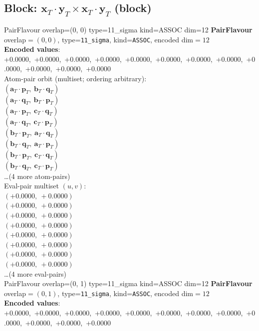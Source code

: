 \documentclass[a4paper,11pt]{article}
\newcommand{\fpbeomcfokjooi}[2]{\mathbf{#1}_T \cdot \mathbf{#2}_T}
\begin{document}
\subsection{Block: $\fpbeomcfokjooi{x}{y} \times \fpbeomcfokjooi{x}{y}$  (block)}
    PairFlavour  overlap=(0, 0)  type=11\_sigma  kind=ASSOC  dim=12
\textbf{PairFlavour} overlap$=(0, 0)$, type=\texttt{11\_sigma}, kind=\texttt{ASSOC}, encoded dim$=12$\\
\textbf{      Encoded values}: +0.0000,\ +0.0000,\ +0.0000,\ +0.0000,\ +0.0000,\ +0.0000,\ +0.0000,\ +0.0000,\ +0.0000,\ +0.0000,\ +0.0000,\ +0.0000\\
\quad Atom-pair orbit (multiset; ordering arbitrary):\\
$(\fpbeomcfokjooi{a}{p},\ \fpbeomcfokjooi{b}{q})$\\
$(\fpbeomcfokjooi{a}{q},\ \fpbeomcfokjooi{b}{p})$\\
$(\fpbeomcfokjooi{a}{p},\ \fpbeomcfokjooi{c}{q})$\\
$(\fpbeomcfokjooi{a}{q},\ \fpbeomcfokjooi{c}{p})$\\
$(\fpbeomcfokjooi{b}{p},\ \fpbeomcfokjooi{a}{q})$\\
$(\fpbeomcfokjooi{b}{q},\ \fpbeomcfokjooi{a}{p})$\\
$(\fpbeomcfokjooi{b}{p},\ \fpbeomcfokjooi{c}{q})$\\
$(\fpbeomcfokjooi{b}{q},\ \fpbeomcfokjooi{c}{p})$\\
\quad \ldots (4 more atom-pairs)\\
\quad Eval-pair multiset $(u, v)$:\\
$(+0.0000,\ +0.0000)$\\
$(+0.0000,\ +0.0000)$\\
$(+0.0000,\ +0.0000)$\\
$(+0.0000,\ +0.0000)$\\
$(+0.0000,\ +0.0000)$\\
$(+0.0000,\ +0.0000)$\\
$(+0.0000,\ +0.0000)$\\
$(+0.0000,\ +0.0000)$\\
\quad \ldots (4 more eval-pairs)\\
    PairFlavour  overlap=(0, 1)  type=11\_sigma  kind=ASSOC  dim=12
\textbf{PairFlavour} overlap$=(0, 1)$, type=\texttt{11\_sigma}, kind=\texttt{ASSOC}, encoded dim$=12$\\
\textbf{      Encoded values}: +0.0000,\ +0.0000,\ +0.0000,\ +0.0000,\ +0.0000,\ +0.0000,\ +0.0000,\ +0.0000,\ +0.0000,\ +0.0000,\ +0.0000,\ +0.0000\\
\end{document}
